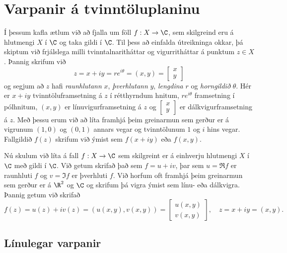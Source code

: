 \section{Varpanir á tvinntöluplaninu}

\noindent
Í þessum kafla ætlum við að fjalla um föll $f:X\to \C$, sem skilgreind
eru á hlutmengi $X$ í $\C$ og taka gildi í $\C$.  Til þess að einfalda
útreikninga okkar, þá skiptum við frjálslega milli tvinntalnaritháttar og
vigurritháttar á punktum $z\in X$.  Þannig skrifum við
$$
z=x+iy=re^{i{\theta}}=(x,y)=\left[\begin{matrix} x\\ y\end{matrix}\right]
$$ 
og segjum að $z$ hafi {\it
raunhlutann} $x$, {\it
þverhlutann} $y$,
{\it lengdina} $r$ og {\it
horngildið}
${\theta}$.  Hér er $x+iy$ tvinntöluframsetning
á  $z$ í rétthyrndum hnitum, $re^{i{\theta}}$
framsetning í pólhnitum, $(x,y)$ er
línu\-vigur\-fram\-setning á $z$  og $\left[\begin{matrix} x\\
y\end{matrix}\right]$ er dálk\-vigur\-fram\-setning á $z$. Með þessu
erum við að líta framhjá þeim greinarmun sem gerður er á 
vigrunum $(1,0)$ og $(0,1)$ annars vegar og
tvinntölunum  
$1$ og $i$ hins vegar.
Fallgildið $f(z)$ skrifum við ýmist sem $f(x+iy)$ eða $f(x,y)$.


Nú skulum við líta á fall $f:X\to \C$ sem skilgreint er á einhverju
hlutmengi $X$ í $\C$ með gildi í $\C$.  Við getum skrifað það sem
$f=u+iv$, þar sem $u=\Re f$ er raunhluti $f$ og $v=\Im f$ er þverhluti
$f$. Við horfum oft framhjá þeim greinarmun sem gerður er á $\R^2$ og
$\C$ og skrifum þá vigra ýmist sem línu- eða dálkvigra.  Þannig getum
við skrifað
$$
f(z)=u(z)+iv(z)=(u(x,y), v(x,y))=
\left[\begin{matrix} u(x,y) \\ v(x,y)\end{matrix}\right], \quad
z=x+iy=(x,y).
$$


\subsection*{Línulegar varpanir}

